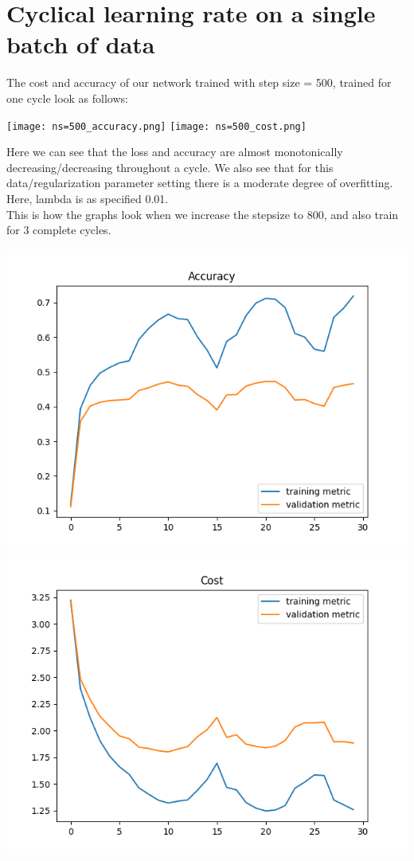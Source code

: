 \documentclass[11pt,a4paper]{article}
\begin{document}
\section{Cyclical learning rate on a single batch of data}
The cost and accuracy of our network trained with step size = 500, trained for one cycle look as follows:

\texttt{[image: ns=500\_accuracy.png]}
\texttt{[image: ns=500\_cost.png]}

Here we can see that the loss and accuracy are almost monotonically decreasing/decreasing throughout a cycle. We also see that for this data/regularization parameter setting there is a moderate degree of overfitting. Here, lambda is as specified 0.01.\\

This is how the graphs look when we increase the stepsize to 800, and also train for 3 complete cycles.

\includegraphics[width=\textwidth]{ns=800_accuracy.png}
\includegraphics[width=\textwidth]{ns=800_cost.png}
\end{document}
